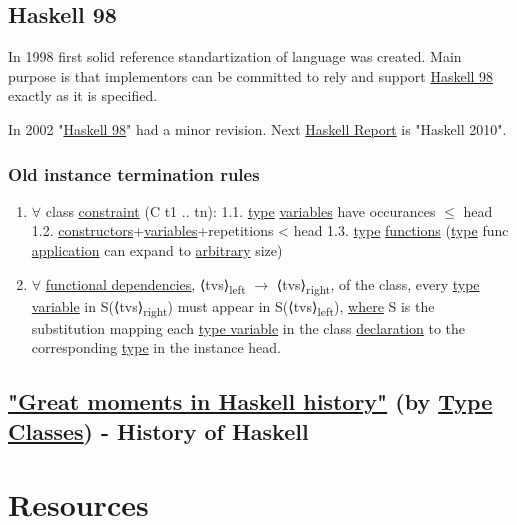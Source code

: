 \documentclass[a4paper,14pt,oneside]{book}
\begin{document}
\section{\label{org869bb63}Haskell 98}
\label{sec:org9fb2c84}
In 1998 first solid reference standartization of language was created. Main purpose is that implementors can be committed to rely and support \hyperref[org869bb63]{Haskell 98} exactly as it is specified.

In 2002 "\hyperref[org869bb63]{Haskell 98}" had a minor revision. Next \hyperref[orge3cbb66]{Haskell Report} is "Haskell 2010".

\subsection{\label{org51462a4}Old instance termination rules}
\label{sec:org2ea8d9f}

\begin{enumerate}
\item \(\forall\) class \hyperref[orgbf48c50]{constraint} (C t1 .. tn):
1.1. \hyperref[org8429d9d]{type} \hyperref[orgb96ec88]{variables} have occurances \(\le\) head
1.2. \hyperref[org153a8d1]{constructors}+\hyperref[orgb96ec88]{variables}+repetitions < head
1.3. \textlnot{} \hyperref[org8429d9d]{type} \hyperref[org7db6ce2]{functions} (\hyperref[org8429d9d]{type} func \hyperref[org1e8aeb0]{application} can expand to \hyperref[org2b1cddf]{arbitrary} size)
\item \(\forall\) \hyperref[orgad724b9]{functional dependencies}, ⟨tvs⟩\textsubscript{left} \(\to\) ⟨tvs⟩\textsubscript{right}, of the class, every \hyperref[org7c6d231]{type variable} in S(⟨tvs⟩\textsubscript{right}) must appear in S(⟨tvs⟩\textsubscript{left}), \hyperref[orga2f82ad]{where} S is the substitution mapping each \hyperref[org7c6d231]{type variable} in the class \hyperref[orgd24d203]{declaration} to the corresponding \hyperref[org8429d9d]{type} in the instance head.
\end{enumerate}

\section{\href{https://typeclasses.com/timeline}{"Great moments in Haskell history"} (by \hyperref[org53fcbf8]{Type Classes}) - History of Haskell}
\label{sec:org83ffec0}

\chapter{Resources}
\label{sec:org7617496}
\end{document}
